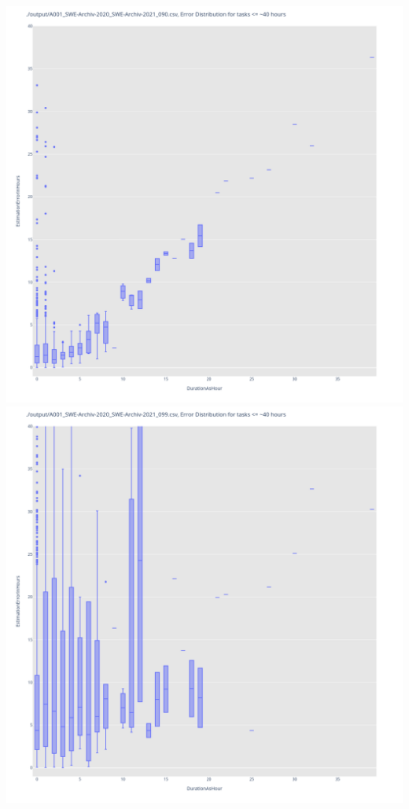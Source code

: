 \includegraphics[width=\textwidth]{Scripts/output/A001_SWE-Archiv-2020_SWE-Archiv-2021_090.csv.error_distribution.png}
\includegraphics[width=\textwidth]{Scripts/output/A001_SWE-Archiv-2020_SWE-Archiv-2021_099.csv.error_distribution.png}

